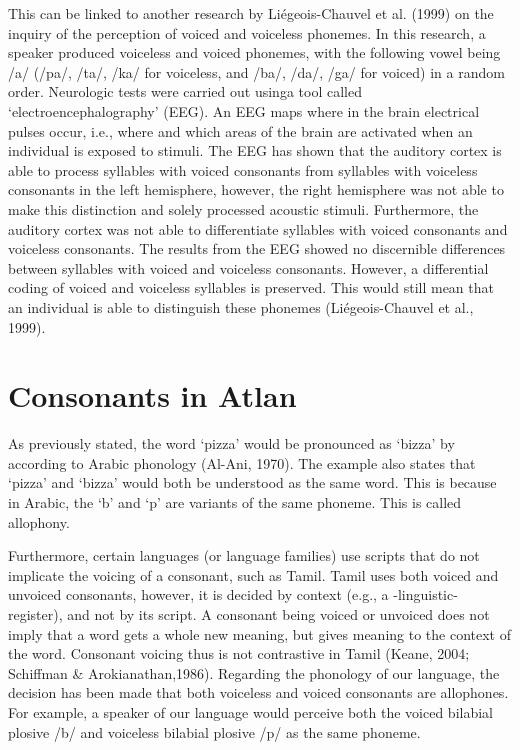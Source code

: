 This can be linked to another research by Liégeois-Chauvel et al. (1999) on the inquiry of the perception of voiced and voiceless phonemes. In this research, a speaker produced voiceless and voiced phonemes, with the following vowel being /a/ (/pa/, /ta/, /ka/ for voiceless, and /ba/, /da/, /ga/ for voiced) in a random order. Neurologic tests were carried out usinga tool called ‘electroencephalography’ (EEG). An EEG maps where in the brain electrical pulses occur, i.e., where and which areas of the brain are activated when an individual is exposed to stimuli. The EEG has shown that the auditory cortex is able to process syllables with voiced consonants from syllables with voiceless consonants in the left hemisphere, however, the right hemisphere was not able to make this distinction and solely processed acoustic stimuli. Furthermore, the auditory cortex was not able to differentiate syllables with voiced consonants and voiceless consonants. The results from the EEG showed no discernible differences between syllables with voiced and voiceless consonants. However, a differential coding of voiced and voiceless syllables is preserved. This would still mean that an individual is able to distinguish these phonemes (Liégeois-Chauvel et al., 1999).


\section{Consonants in Atlan}
As previously stated, the word ‘pizza’ would be pronounced as ‘bizza’ by according to Arabic phonology (Al-Ani, 1970). The example also states that ‘pizza’ and ‘bizza’ would both be understood as the same word. This is because in Arabic, the ‘b’ and ‘p’ are variants of the same phoneme. This is called allophony. 

Furthermore, certain languages (or language families) use scripts that do not implicate the voicing of a consonant, such as Tamil. Tamil uses both voiced and unvoiced consonants, however, it is decided by context (e.g., a -linguistic- register), and not by its script. A consonant being voiced or unvoiced does not imply that a word gets a whole new meaning, but gives meaning to the context of the word. Consonant voicing thus is not contrastive in Tamil (Keane, 2004; Schiffman \& Arokianathan,1986). Regarding the phonology of our language, the decision has been made that both voiceless and voiced consonants are allophones. For example, a speaker of our language would perceive both the voiced bilabial plosive /b/ and voiceless bilabial plosive /p/ as the same phoneme.  

